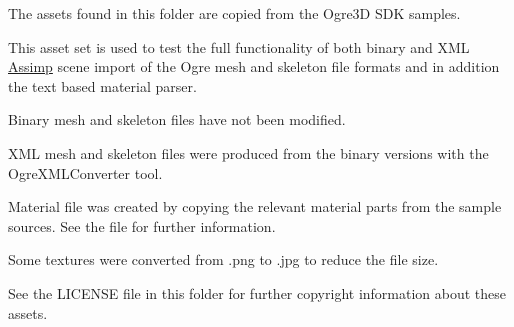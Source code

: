 The assets found in this folder are copied from the Ogre3\+D S\+D\+K samples.

This asset set is used to test the full functionality of both binary and X\+M\+L \hyperlink{class_assimp}{Assimp} scene import of the Ogre mesh and skeleton file formats and in addition the text based material parser.


\begin{DoxyItemize}
\item Binary mesh and skeleton files have not been modified.
\item X\+M\+L mesh and skeleton files were produced from the binary versions with the {\ttfamily Ogre\+X\+M\+L\+Converter} tool.
\item Material file was created by copying the relevant material parts from the sample sources. See the file for further information.
\item Some textures were converted from .png to .jpg to reduce the file size.
\end{DoxyItemize}

See the L\+I\+C\+E\+N\+S\+E file in this folder for further copyright information about these assets. 